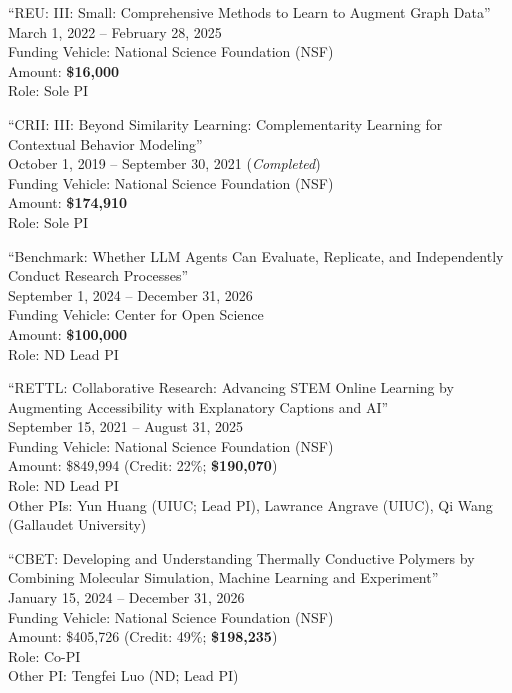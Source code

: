 \documentclass[10pt]{article}
\newenvironment{myindentpar}[1]%
{\begin{list}{}%
         {\setlength{\leftmargin}{#1}}%
         \item[]%
}
{\end{list}}
\newcounter{list}
\begin{document}
\begin{myindentpar}{0.75cm}
\hspace{-0.75cm}``REU: III: Small: Comprehensive Methods to Learn to Augment Graph Data'' \\
March 1, 2022 -- February 28, 2025 \\
Funding Vehicle: National Science Foundation (NSF) \\
Amount: \textbf{\$16,000} \\
Role: {Sole PI}

\hspace{-0.75cm}``CRII: III: Beyond Similarity Learning: Complementarity Learning for Contextual Behavior Modeling'' \\
October 1, 2019 -- September 30, 2021 (\emph{Completed}) \\
Funding Vehicle: National Science Foundation (NSF) \\
Amount: \textbf{\$174,910} \\
Role: {Sole PI}

\hspace{-0.75cm}``Benchmark: Whether LLM Agents Can Evaluate, Replicate, and Independently Conduct Research Processes'' \\
September 1, 2024 -- December 31, 2026 \\
Funding Vehicle: Center for Open Science \\
Amount: \textbf{\$100,000} \\
Role: {ND Lead PI}


\hspace{-0.75cm}``RETTL: Collaborative Research: Advancing STEM Online Learning by Augmenting Accessibility with Explanatory Captions and AI'' \\
September 15, 2021 -- August 31, 2025 \\
Funding Vehicle: National Science Foundation (NSF) \\
Amount: \$849,994 (Credit: 22\%; \textbf{\$190,070}) \\
Role: {ND Lead PI} \\
Other PIs: Yun Huang (UIUC; Lead PI), Lawrance Angrave (UIUC), Qi Wang (Gallaudet University)

\hspace{-0.75cm}``CBET: Developing and Understanding Thermally Conductive Polymers by Combining Molecular Simulation, Machine Learning and Experiment'' \\
January 15, 2024 -- December 31, 2026 \\
Funding Vehicle: National Science Foundation (NSF) \\
Amount: \$405,726 (Credit: 49\%; \textbf{\$198,235}) \\
Role: {Co-PI} \\
Other PI: Tengfei Luo (ND; Lead PI)


\end{myindentpar}
\end{document}
